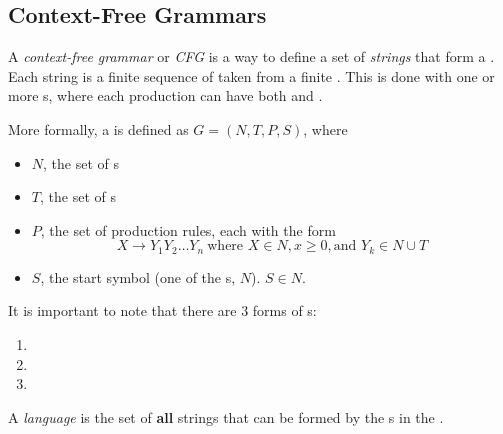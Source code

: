 \subsection{Context-Free Grammars}\label{subsec:Context_Free_Grammars}
\begin{definition}\label{def:Context_Free_Grammar}
  A \emph{context-free grammar} or \emph{CFG} is a way to define a set of \textit{strings} that form a .
  Each string is a finite sequence of  taken from a finite .
  This is done with one or more s, where each production can have both  and .

  More formally, a  is defined as $G = (N, T, P, S)$, where
  \begin{itemize}[noitemsep]
  \item $N$, the set of s
  \item $T$, the set of s
  \item $P$, the set of production rules, each with the form
    \begin{equation*}
      X \rightarrow Y_{1} Y_{2} \ldots Y_{n} \: \text{where } X \in N, x \geq 0, \text{and } Y_{k} \in N \cup T
    \end{equation*}
  \item $S$, the start symbol (one of the s, $N$). $S \in N$.
  \end{itemize}

  \begin{remark}
    It is important to note that there are 3 forms of s:
    \begin{enumerate}[noitemsep]
    \item {}
    \item {}
    \item {}
    \end{enumerate}
  \end{remark}
\end{definition}

\begin{definition}[Language]\label{def:Language}
  A \emph{language} is the set of \textbf{\textup{all}} strings that can be formed by the s in the .
\end{definition}

